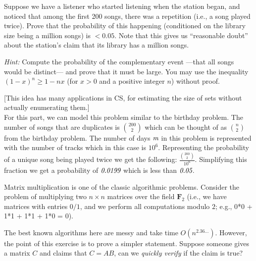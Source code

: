 \documentclass[addpoints, 11pt]{exam}
\begin{document}
\begin{questions}
\begin{parts}
    Suppose we have a listener who started listening when the station began, and noticed that among the first 200 songs, there was a repetition (i.e., a song played twice). Prove that the probability of this happening (conditioned on the library size being a million songs) is $<0.05$.  Note that this gives us ``reasonable doubt'' about the station's claim that its library has a million songs.

      {\em Hint: } Compute the probability of the complementary event ---that all songs would be distinct--- and prove that it must be large. You may use the inequality $(1-x)^n \ge 1-nx$ (for $x > 0$ and a positive integer $n$) without proof.

      [This idea has many applications in CS, for estimating the size of sets without actually enumerating them.] \\

    For this part, we can model this problem similar to the birthday problem. The number of songs that are duplicates is $200 \choose 2$ which can be thought of as $n \choose 2$ from the birthday problem.
    The number of days $\emph{m}$ in this problem is represented with the number of tracks which in this case is $10^{6}$. Representing the probability of a unique song being played twice we get the following: $\frac{{200 \choose 2}}{10^{6}}$.
    Simplifying this fraction we get a probability of $\emph{0.0199}$ which is less than $\emph{0.05}$.
  \end{parts}

  Matrix multiplication is one of the classic algorithmic problems.  Consider the problem of multiplying two $n \times n$ matrices over the field $\mathbf{F}_2$ (i.e., we have matrices with entries $0/1$, and we perform all computations modulo $2$; e.g., 0*0 + 1*1 + 1*1 + 1*0 = 0).

  The best known algorithms here are messy and take time $O(n^{2.36...})$.  However, the point of this exercise is to prove a simpler statement. Suppose someone gives a matrix $C$ and claims that $C = AB$, can we {\em quickly verify} if the claim is true?

  \begin{parts}

\end{parts}
\end{questions}
\end{document}
